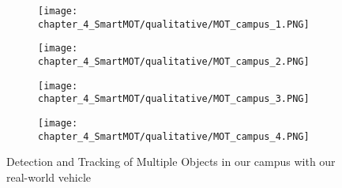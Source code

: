 \begin{figure}[h]
	\centering
	\begin{subfigure}{0.43\textwidth}
		\captionsetup{justification=centering}
		\texttt{[image: chapter\_4\_SmartMOT/qualitative/MOT\_campus\_1.PNG]}
		\caption{}
	\end{subfigure}
	\hfill
	\begin{subfigure}{0.43\textwidth}
		\captionsetup{justification=centering}
		\texttt{[image: chapter\_4\_SmartMOT/qualitative/MOT\_campus\_2.PNG]}
		\caption{}
	\end{subfigure}
	\hfill
	\begin{subfigure}{0.43\textwidth}
		\captionsetup{justification=centering}
		\texttt{[image: chapter\_4\_SmartMOT/qualitative/MOT\_campus\_3.PNG]}
		\caption{}
	\end{subfigure}
	\hfill
	\begin{subfigure}{0.43\textwidth}
		\captionsetup{justification=centering}
		\texttt{[image: chapter\_4\_SmartMOT/qualitative/MOT\_campus\_4.PNG]}
		\caption{}
	\end{subfigure}
	\caption{Detection and Tracking of Multiple Objects in our campus with our real-world vehicle}
	\label{fig:chapter_4_SmartMOT/MOT_campus}
\end{figure}

